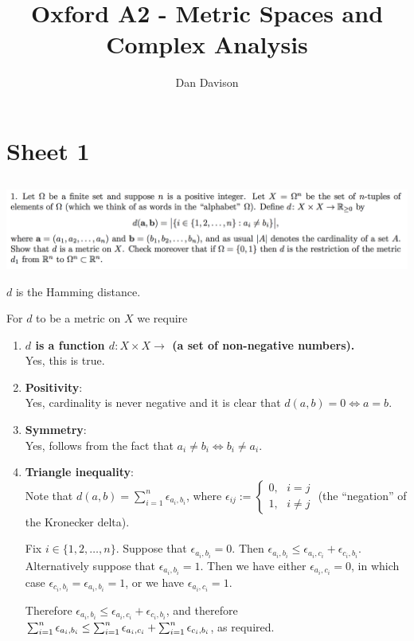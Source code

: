 \documentclass[12pt]{article}
\title{Oxford A2 - Metric Spaces and Complex Analysis
  \footnotetext{\url{https://courses.maths.ox.ac.uk/node/5378}}} \author{Dan Davison}
\author{}
\date{}
\begin{document}
\maketitle
\tableofcontents

\section{Sheet 1}

\subsection{}
\begin{mdframed}
\includegraphics[width=400pt]{img/oxford-a2-1-1.png}
\end{mdframed}

\begin{remark*}
  $d$ is the Hamming distance.
\end{remark*}

For $d$ to be a metric on $X$ we require
\begin{enumerate}
\item \textbf{$d$ is a function $d:X \times X \to $ (a set of non-negative numbers).}\\
  Yes, this is true.
\item \textbf{Positivity}:\\
  Yes, cardinality is never negative and it is clear that $d(a,b) = 0 \iff a = b$.
\item \textbf{Symmetry}:\\
  Yes, follows from the fact that $a_i \neq b_i \iff b_i \neq a_i$.
\item \textbf{Triangle inequality}:\\
  Note that $d(a, b) = \sum_{i=1}^n \epsilon_{a_i,b_i}$, where $\epsilon_{ij} :=
  \begin{cases}
    0, ~~~ i = j\\
    1, ~~~ i \neq j
  \end{cases}
$ (the ``negation'' of the Kronecker delta).

  Fix $i \in \{1, 2, \ldots, n\}$. Suppose that $\epsilon_{a_i,b_i} = 0$. Then
  $\epsilon_{a_i,b_i} \leq \epsilon_{a_i,c_i} + \epsilon_{c_i,b_i}$. Alternatively suppose that
  $\epsilon_{a_i,b_i} = 1$. Then we have either $\epsilon_{a_i,c_i} = 0$, in which case
  $\epsilon_{c_i,b_i} = \epsilon_{a_i,b_i} = 1$, or we have $\epsilon_{a_i,c_i} = 1$.

  Therefore $\epsilon_{a_i,b_i} \leq \epsilon_{a_i,c_i} + \epsilon_{c_i,b_i}$, and therefore
  $\sum_{i=1}^{n} \epsilon_{a_i,b_i} \leq \sum_{i=1}^{n} \epsilon_{a_i,c_i} + \sum_{i=1}^{n} \epsilon_{c_i,b_i}$, as required.
\end{enumerate}
\end{document}
